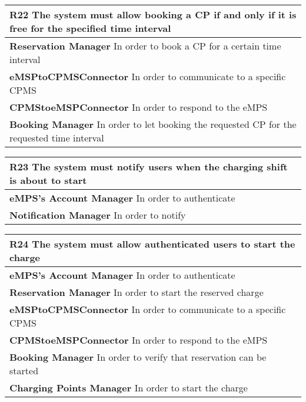 \begin{table}[H]
    \begin{tabularx}{\textwidth}{X}
        \toprule
        \textbf{R22} The system must allow booking a CP if and only if it is free for the specified time interval \\ \midrule
        \textbf{Reservation Manager} In order to book a CP for a certain time interval                            \\
        \textbf{eMSPtoCPMSConnector} In order to communicate to a specific CPMS                                   \\
        \textbf{CPMStoeMSPConnector} In order to respond to the eMPS                                              \\
        \textbf{Booking Manager} In order to let booking the requested CP for the requested time interval         \\
    \end{tabularx}
\end{table}
\begin{table}[H]
    \begin{tabularx}{\textwidth}{X}
        \toprule
        \textbf{R23}  The system must notify users when the charging shift is about to start \\ \midrule
        \textbf{eMPS's Account Manager} In order to authenticate                             \\
        \textbf{Notification Manager} In order to notify                                     \\
    \end{tabularx}
\end{table}
\begin{table}[H]
    \begin{tabularx}{\textwidth}{X}
        \toprule
        \textbf{R24} The system must allow authenticated users to start the charge  \\ \midrule
        \textbf{eMPS's Account Manager} In order to authenticate                    \\
        \textbf{Reservation Manager} In order to start the reserved charge        \\
        \textbf{eMSPtoCPMSConnector} In order to communicate to a specific CPMS     \\
        \textbf{CPMStoeMSPConnector} In order to respond to the eMPS                \\
        \textbf{Booking Manager} In order to verify that reservation can be started \\
        \textbf{Charging Points Manager} In order to start the charge               \\
    \end{tabularx}
\end{table}
